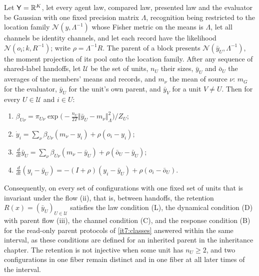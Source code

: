 \documentclass[11pt,letterpaper]{report}
\begin{document}
Let $\mathsf Y=\mathbb R^K$, let every agent law, compared law, presented law and the evaluator be Gaussian with one fixed precision matrix $\Lambda$, recognition being restricted to the location family $\mathcal N(y,\Lambda^{-1})$ whose Fisher metric on the means is $\Lambda$, let all channels be identity channels, and let each record have the likelihood $\mathcal N(o_i;k,R^{-1})$; write $\rho=\Lambda^{-1}R$. The parent of a block presents $\mathcal N(\bar y_U,\Lambda^{-1})$, the moment projection of its pool onto the location family. After any sequence of shared-label handoffs, let $\mathcal U$ be the set of units, $n_U$ their sizes, $\bar y_U$ and $\bar o_U$ the averages of the members' means and records, and $m_\nu$ the mean of source $\nu$: $m_G$ for the evaluator, $\bar y_U$ for the unit's own parent, and $\bar y_V$ for a unit $V\ne U$. Then for every $U\in\mathcal U$ and $i\in U$:
\begin{enumerate}
\item[(i)] $\beta_{U\nu}=\pi_{U\nu}\exp\bigl(-\tfrac{n_U}{2T}\Vert\bar y_U-m_\nu\Vert_\Lambda^2\bigr)/Z_U$;
\item[(ii)] $\dot y_i=\sum_\nu\beta_{U\nu}(m_\nu-y_i)+\rho(o_i-y_i)$;
\item[(iii)] $\frac{d}{dt}\bar y_U=\sum_\nu\beta_{U\nu}(m_\nu-\bar y_U)+\rho(\bar o_U-\bar y_U)$;
\item[(iv)] $\frac{d}{dt}(y_i-\bar y_U)=-(I+\rho)(y_i-\bar y_U)+\rho(o_i-\bar o_U)$.
\end{enumerate}
Consequently, on every set of configurations with one fixed set of units that is invariant under the flow (ii), that is, between handoffs, the retention $R(x)=(\bar y_U)_{U\in\mathcal U}$ satisfies the law condition (L), the dynamical condition (D) with parent flow (iii), the channel condition (C), and the response condition (B) for the read-only parent protocols of \cref{it7:classes} answered within the same interval, as these conditions are defined for an inherited parent in the inheritance chapter. The retention is not injective when some unit has $n_U\ge2$, and two configurations in one fiber remain distinct and in one fiber at all later times of the interval.
\end{document}
